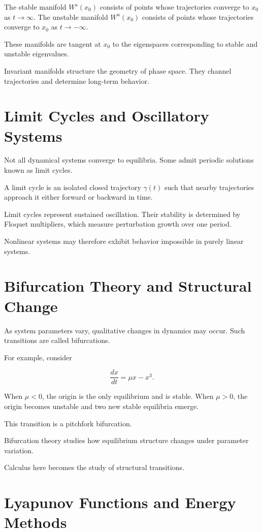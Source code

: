 \documentclass[12pt]{book}
\begin{document}
The stable manifold $W^s(x_0)$ consists of points whose trajectories converge to $x_0$ as $t \to \infty$. The unstable manifold $W^u(x_0)$ consists of points whose trajectories converge to $x_0$ as $t \to -\infty$.

These manifolds are tangent at $x_0$ to the eigenspaces corresponding to stable and unstable eigenvalues.

Invariant manifolds structure the geometry of phase space. They channel trajectories and determine long-term behavior.

\section{Limit Cycles and Oscillatory Systems}

Not all dynamical systems converge to equilibria. Some admit periodic solutions known as limit cycles.

A limit cycle is an isolated closed trajectory $\gamma(t)$ such that nearby trajectories approach it either forward or backward in time.

Limit cycles represent sustained oscillation. Their stability is determined by Floquet multipliers, which measure perturbation growth over one period.

Nonlinear systems may therefore exhibit behavior impossible in purely linear systems.

\section{Bifurcation Theory and Structural Change}

As system parameters vary, qualitative changes in dynamics may occur. Such transitions are called bifurcations.

For example, consider

\[
\frac{dx}{dt} = \mu x - x^3.
\]

When $\mu < 0$, the origin is the only equilibrium and is stable. When $\mu > 0$, the origin becomes unstable and two new stable equilibria emerge.

This transition is a pitchfork bifurcation.

Bifurcation theory studies how equilibrium structure changes under parameter variation.

Calculus here becomes the study of structural transitions.

\section{Lyapunov Functions and Energy Methods}
\end{document}
